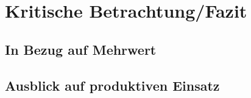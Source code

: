 \section{Kritische Betrachtung/Fazit}
\subsection{In Bezug auf Mehrwert}
\subsection{Ausblick auf produktiven Einsatz}